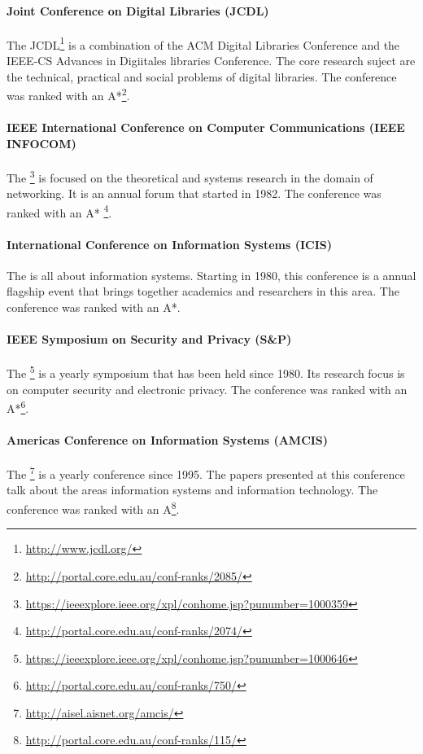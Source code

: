 \paragraph{Joint Conference on Digital Libraries (JCDL)}
The JCDL\footnote{\url{http://www.jcdl.org/}} is a combination of the ACM Digital Libraries Conference and the IEEE-CS Advances in Digiitales libraries Conference.
The core research suject are the technical, practical and social problems of digital libraries. The conference was ranked with an A*\footnote{\url{http://portal.core.edu.au/conf-ranks/2085/}}.
\paragraph{IEEE International Conference on Computer Communications (IEEE INFOCOM)} The \footnote{\url{https://ieeexplore.ieee.org/xpl/conhome.jsp?punumber=1000359}} is focused on the theoretical and systems research in the domain of networking. It is an annual forum that started in 1982. The conference was ranked with an A* \footnote{\url{http://portal.core.edu.au/conf-ranks/2074/}}.
\paragraph{International Conference on Information Systems (ICIS)}
The  is all about information systems. Starting in 1980, this conference is a annual flagship event that brings together academics and researchers in this area. The conference was ranked with an A*. 
\paragraph{IEEE Symposium on Security and Privacy (S\&P)}
The \footnote{\url{https://ieeexplore.ieee.org/xpl/conhome.jsp?punumber=1000646}} is a yearly symposium that has been held since 1980. Its research focus is on computer security and electronic privacy. The conference was ranked with an A*\footnote{\url{http://portal.core.edu.au/conf-ranks/750/}}.
\paragraph{Americas Conference on Information Systems (AMCIS)} The \footnote{\url{http://aisel.aisnet.org/amcis/}} is a yearly conference since 1995. The papers presented at this conference talk about the areas information systems and information technology. The conference was ranked with an A\footnote{\url{http://portal.core.edu.au/conf-ranks/115/}}.
